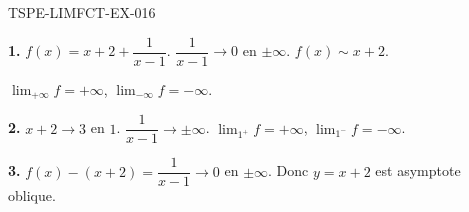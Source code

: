 \begin{corrige}{TSPE-LIMFCT-EX-016}

\textbf{1.} $f(x) = x+2+\dfrac{1}{x-1}$. $\dfrac{1}{x-1} \to 0$ en $\pm\infty$. $f(x) \sim x+2$.

$\lim_{+\infty} f = \boxed{+\infty}$, $\lim_{-\infty} f = \boxed{-\infty}$.

\textbf{2.} $x+2 \to 3$ en $1$. $\dfrac{1}{x-1} \to \pm\infty$. $\lim_{1^+} f = \boxed{+\infty}$, $\lim_{1^-} f = \boxed{-\infty}$.

\textbf{3.} $f(x) - (x+2) = \dfrac{1}{x-1} \to 0$ en $\pm\infty$. Donc $y = x+2$ est asymptote oblique.

\end{corrige}

